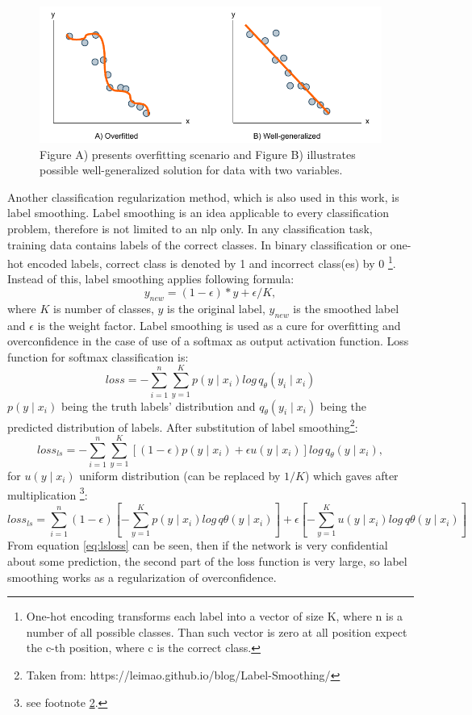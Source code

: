 \begin{figure}[H]
\centering
\includegraphics[width=1\columnwidth]{../img/overfitting}
\caption{Figure A) presents overfitting scenario and Figure B) illustrates possible well-generalized solution for data with two variables. }
\label{pic:overfitting}
\end{figure}
Another classification regularization method, which is also used in this work, is label smoothing. Label smoothing \citep{Szegedy2015} is an idea applicable to every classification problem, therefore is not limited to an \acrshort{nlp} only.
In any classification task, training data contains labels of the correct classes. In binary classification or one-hot encoded labels, correct class is denoted by 1 and incorrect class(es) by 0 \footnote{One-hot encoding transforms each label into a vector of size K, where n is a number of all possible classes. Than such vector is zero at all position expect the c-th position, where c is the correct class.}. Instead of this, label smoothing applies following formula: 
$$y_{new} = (1 - \epsilon) * y + \epsilon / K,$$ where $K$ is number of classes, $y$ is the original label, $y_{new}$ is the smoothed label and $\epsilon$ is the weight factor. Label smoothing is used as a cure for overfitting and overconfidence in the case of use of a softmax as output activation function. Loss function for softmax classification is: 
 $$ loss = -\sum_{i=1}^{n} \sum_{y=1}^{K} p(y \mid x_i) log \, q_{\theta} ( y_i \mid x_i ) $$
 $p(y \mid x_i)$ being the truth labels' distribution and $q_{\theta} ( y_i \mid x_i )$ being the predicted distribution of labels. After substitution of label smoothing\footnote{\label{note1} Taken from: https://leimao.github.io/blog/Label-Smoothing/}:
$$
loss_{ls} = -\sum_{i=1}^{n} \sum_{y=1}^{K} [(1-\epsilon) p(y \mid x_i)+\epsilon u(y\mid x_i)]log \, q_\theta(y \mid x_i), $$
for $u(y\mid x_i)$ uniform distribution (can be replaced by $1/K$)
which gaves after multiplication \footnote{see footnote \ref{note1}.}:
 \begin{equation} \label{eq:lsloss}
 loss_{ls}= \sum_{i=1}^{n} {(1- \epsilon)[- \sum_{y=1}^{K} p(y\mid x_i) log \, q\theta(y \mid x_i)]+\epsilon [- \sum_{y=1}^{K} u(y \mid x_i)log \, q\theta (y\mid x_i)]}
 \end{equation}
From equation \ref{eq:lsloss} can be seen, then if the network is very confidential about some prediction, the second part of the loss function is very large, so label smoothing works as a regularization of overconfidence.

